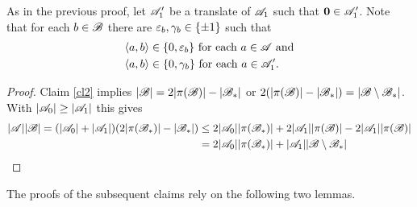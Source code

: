 As in the previous proof, let ${\mathscr{A}}_1'$ be a translate of ${\mathscr{A}}_1$ such that $\mathbf{0} \in {\mathscr{A}}_1'$.
Note that for each $b \in {\mathscr{B}}$ there are ${\varepsilon}_b,\gamma_b \in \{\pm 1\}$ such that
\begin{align}
    \label{eqscaleps}
    & \langle a, b\rangle \in \{0,{\varepsilon}_b\} \text{ for each } a \in {\mathscr{A}} \text{ and} \\
    \label{eqscala1pgamma}
    & \langle a, b\rangle \in \{0,\gamma_b\} \text{ for each } a \in {\mathscr{A}}_1'.
\end{align}

\ineqbasic*
\begin{proof}
    Claim \ref{cl2} implies $|{\mathscr{B}}| = 2|\pi({\mathscr{B}})| - |{\mathscr{B}}_*|$ or $2(|\pi({\mathscr{B}})| - |{\mathscr{B}}_*|) = |{\mathscr{B}} \setminus {\mathscr{B}}_*|$. With $|{\mathscr{A}}_0|\geq|{\mathscr{A}}_1|$ this gives
    \begin{align*}
        |{\mathscr{A}}||{\mathscr{B}}| = (|{\mathscr{A}}_0| + |{\mathscr{A}}_1|)(2|\pi({\mathscr{B}}_*)| - |{\mathscr{B}}_*|) &\leq 2|{\mathscr{A}}_0||\pi({\mathscr{B}}_*)| + 2|{\mathscr{A}}_1||\pi({\mathscr{B}})|-2|{\mathscr{A}}_1||\pi({\mathscr{B}})| \\
        &= 2|{\mathscr{A}}_0||\pi({\mathscr{B}}_*)| + |{\mathscr{A}}_1||{\mathscr{B}} \setminus {\mathscr{B}}_*|
    \end{align*}   
\end{proof}

\noindent The proofs of the subsequent claims rely on the following two lemmas.

